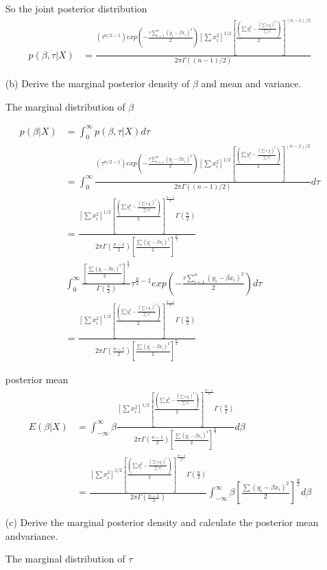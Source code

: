 \documentclass[11pt]{article} %
\begin{document}
\begin{itemize}
So the joint posterior distribution
\begin{align*}
	p(\beta, \tau|X) &= \frac{({\tau^{n/2-1}}) exp(-\frac{\tau \sum_{i=1}^n (y_i-\beta x_i)^2}{2}) [\sum x_i^2]^{1/2} [\frac{(\sum y_i^2 - \frac{(\sum x_iy_i)^2}{\sum x_i^2})}{2}]^{(n-1)/2}}{ 2\pi \Gamma((n-1)/2)} 
\end{align*}	

\item[(b)] Derive the marginal posterior density of $\beta$ and mean and variance.

The marginal distribution of $\beta$ 

\begin{align*}
	p(\beta|X) &= \int_{0}^{\infty} p(\beta, \tau|X) d \tau \\
	&=\int_{0}^{\infty}  \frac{({\tau^{n/2-1}}) exp(-\frac{\tau \sum_{i=1}^n (y_i-\beta x_i)^2}{2}) [\sum x_i^2]^{1/2} [\frac{(\sum y_i^2 - \frac{(\sum x_iy_i)^2}{\sum x_i^2})}{2}]^{(n-1)/2}}{ 2\pi \Gamma((n-1)/2)} d\tau \\
	&= \frac{[\sum x_i^2]^{1/2} [\frac{(\sum y_i^2 - \frac{(\sum x_iy_i)^2}{\sum x_i^2})}{2}]^{\frac{n-1}{2}} \Gamma(\frac{n}{2})}{2\pi \Gamma(\frac{n-1}{2}) [\frac{\sum(y_i-\beta x_i)^2}{2}]^{\frac{n}{2}}} \\
	& \int_{0}^{\infty} \frac{[\frac{\sum(y_i-\beta x_i)^2}{2}]^{\frac{n}{2}}}{ \Gamma(\frac{n}{2})} \tau^{\frac{n}{2}-1} exp(-\frac{\tau \sum_{i=1}^n (y_i-\beta x_i)^2}{2})  d\tau \\
	&=\frac{[\sum x_i^2]^{1/2} [\frac{(\sum y_i^2 - \frac{(\sum x_iy_i)^2}{\sum x_i^2})}{2}]^{\frac{n-1}{2}} \Gamma(\frac{n}{2})}{2\pi \Gamma(\frac{n-1}{2}) [\frac{\sum(y_i-\beta x_i)^2}{2}]^{\frac{n}{2}}} 
\end{align*}	

posterior mean
\begin{align*}
	E(\beta|X) &= \int_{-\infty}^{\infty} \beta \frac{[\sum x_i^2]^{1/2} [\frac{(\sum y_i^2 - \frac{(\sum x_iy_i)^2}{\sum x_i^2})}{2}]^{\frac{n-1}{2}} \Gamma(\frac{n}{2})}{2\pi \Gamma(\frac{n-1}{2}) [\frac{\sum(y_i-\beta x_i)^2}{2}]^{\frac{n}{2}}} d\beta \\
	&= \frac{[\sum x_i^2]^{1/2} [\frac{(\sum y_i^2 - \frac{(\sum x_iy_i)^2}{\sum x_i^2})}{2}]^{\frac{n-1}{2}} \Gamma(\frac{n}{2})}{2\pi \Gamma(\frac{n-1}{2}) } \int_{-\infty}^{\infty} \beta [\frac{\sum(y_i-\beta x_i)^2}{2}]^{\frac{n}{2}} d\beta
\end{align*}	

\item[(c)] Derive the marginal posterior density and calculate the posterior mean andvariance.

The marginal distribution of $\tau$ 



\end{itemize}
\end{document}
